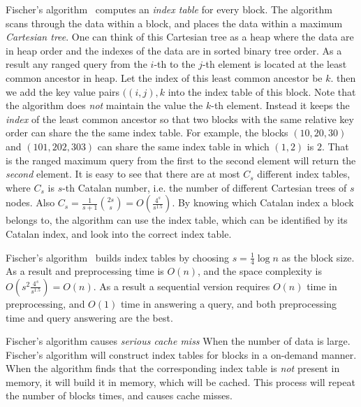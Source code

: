Fischer's algorithm~\cite{Fischer2006TheoreticalAP} computes an {\em
  index table} for every block.  The algorithm scans through the data
within a block, and places the data within a maximum {\em Cartesian
  tree}.  One can think of this Cartesian tree as a heap where the
data are in heap order and the indexes of the data are in sorted
binary tree order.  As a result any ranged query from the $i$-th to
the $j$-th element is located at the least common ancestor in heap.
Let the index of this least common ancestor be $k$. then we add the
key value pairs $((i, j), k$ into the index table of this block.  Note
that the algorithm does {\em not} maintain the value the $k$-th
element.  Instead it keeps the {\em index} of the least common
ancestor so that two blocks with the same relative key order can share
the the same index table.  For example, the blocks $(10, 20, 30)$ and
$(101, 202, 303)$ can share the same index table in which $(1, 2)$ is
$2$.  That is the ranged maximum query from the first to the second
element will return the {\em second} element.  It is easy to see that
there are at most $C_s$ different index tables, where $C_s$ is $s$-th
Catalan number, i.e. the number of different Cartesian trees of $s$
nodes.  Also $C_s = \frac{1}{s+1}\binom{2s}{s} =
O(\frac{4^s}{s^{1.5}})$.  By knowing which Catalan index a block
belongs to, the algorithm can use the index table, which can be
identified by its Catalan index, and look into the correct index
table.

Fischer's algorithm~\cite{Fischer2006TheoreticalAP} builds index
tables by choosing $s = \frac{1}{4} \log n$ as the block size.  As a
result and preprocessing time is $O(n)$, and the space complexity is
$O(s^2 \frac{4^s}{s^{1.5}}) = O(n)$.  As a result a sequential version
requires $O(n)$ time in preprocessing, and $O(1)$ time in answering a
query, and both preprocessing time and query answering are the best.

Fischer's algorithm causes {\em serious cache miss} When the number of
data is large.  Fischer's algorithm will construct index tables for
blocks in a on-demand manner.  When the algorithm finds that the
corresponding index table is {\em not} present in memory, it will
build it in memory, which will be cached.  This process will repeat
the number of blocks times, and causes cache misses.



